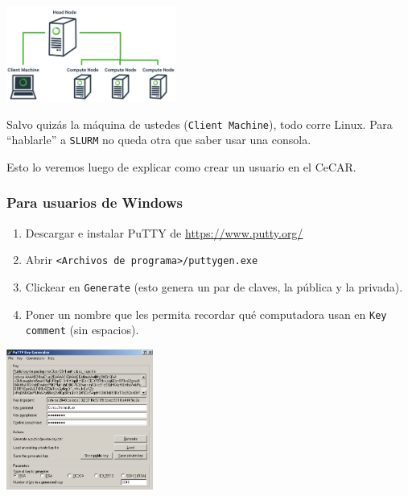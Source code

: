 \documentclass[handout]{beamer}
\begin{document}
\begin{frame}
\begin{center}
\includegraphics[width=15em]{cluster_diagram.png}
\end{center}
Salvo quizás la máquina de ustedes (\Verb=Client Machine=), todo corre Linux. Para ``hablarle'' a \Verb=SLURM= no queda otra que saber usar una consola. 
\vspace{1em}
\pause

Esto lo veremos luego de explicar como crear un usuario en el CeCAR.
\end{frame}

\begin{frame}
\frametitle{Para usuarios de Windows}
\begin{enumerate}
  \item Descargar e instalar PuTTY de \url{https://www.putty.org/}
  \item Abrir \Verb=<Archivos de programa>/puttygen.exe=
  \item Clickear en \Verb=Generate= (esto genera un par de claves, la pública y la privada).
  \item Poner un nombre que les permita recordar qué computadora usan en \Verb=Key comment= (sin espacios).
\end{enumerate}
  \begin{center}
  \includegraphics[width=13em]{./puttygen}
  \end{center} 
\end{frame}
\end{document}
